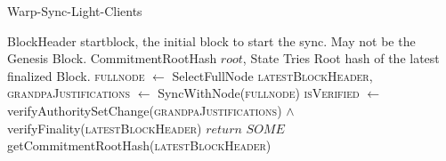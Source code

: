 \begin{algorithm}
\caption{Warp-Sync-Light-Clients}
\begin{algorithmic}
    \INPUT BlockHeader startblock, the initial block to start the sync. May not be the Genesis Block. 
    \OUTPUT CommitmentRootHash $root$, State Tries Root hash of the latest finalized Block. 
    \STATE \textsc{fullnode} $\leftarrow$ SelectFullNode  
    \STATE \textsc{latestBlockHeader, grandpaJustifications} $\leftarrow$ SyncWithNode(\textsc{fullnode})
    \STATE \textsc{isVerified} $\leftarrow$ verifyAuthoritySetChange(\textsc{grandpaJustifications}) $\land$ verifyFinality(\textsc{latestBlockHeader})
        \STATE $return$ $SOME$ getCommitmentRootHash(\textsc{latestBlockHeader})
    \ENDIF
\end{algorithmic}
\end{algorithm}